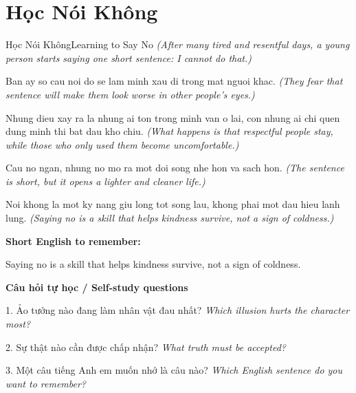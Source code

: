 \section{Học Nói Không}
\begin{truyen}{Học Nói Không}{Learning to Say No}
\textit{(After many tired and resentful days, a young person starts saying one short sentence: I cannot do that.)}

Ban ay so cau noi do se lam minh xau di trong mat nguoi khac.
\textit{(They fear that sentence will make them look worse in other people’s eyes.)}

Nhung dieu xay ra la nhung ai ton trong minh van o lai, con nhung ai chi quen dung minh thi bat dau kho chiu.
\textit{(What happens is that respectful people stay, while those who only used them become uncomfortable.)}

Cau no ngan, nhung no mo ra mot doi song nhe hon va sach hon.
\textit{(The sentence is short, but it opens a lighter and cleaner life.)}

\end{truyen}

\begin{baihoc}
Noi khong la mot ky nang giu long tot song lau, khong phai mot dau hieu lanh lung.
\textit{(Saying no is a skill that helps kindness survive, not a sign of coldness.)}
\end{baihoc}

\begin{ghinhoanh}
\textbf{Short English to remember:}

Saying no is a skill that helps kindness survive, not a sign of coldness.

\end{ghinhoanh}

\begin{tuhocnhanh}
\textbf{Câu hỏi tự học / Self-study questions}

1. Ảo tưởng nào đang làm nhân vật đau nhất? \textit{Which illusion hurts the character most?}

2. Sự thật nào cần được chấp nhận? \textit{What truth must be accepted?}

3. Một câu tiếng Anh em muốn nhớ là câu nào? \textit{Which English sentence do you want to remember?}
\end{tuhocnhanh}
